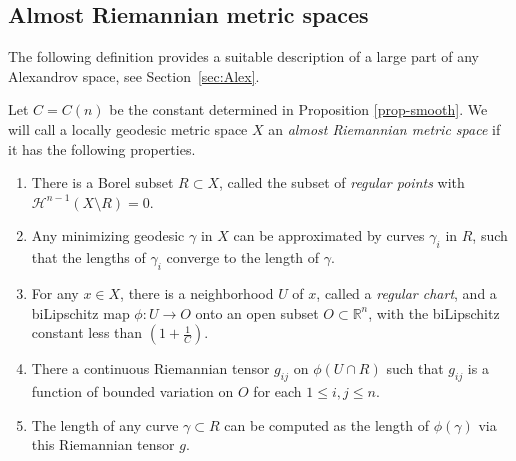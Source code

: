 \documentclass[12pt,leqno,intlimits]{amsart}
\numberwithin{equation}{section}
\theoremstyle{definition}
\theoremstyle{remark}
\newcommand{\R}{\mathbb{R}}
\def\co{\colon\thinspace}
\def\:{\colon}
\begin{document}


\subsection{Almost Riemannian metric spaces}
The following definition provides a suitable description of a  large part of any Alexandrov space, see Section~\ref{sec:Alex}.

 Let  $C =C(n)$ be the constant determined in  Proposition \ref{prop-smooth}. We will call  a locally geodesic metric space
 $X$ an \emph{almost Riemannian metric space}  if it has the following properties.
 \begin{enumerate}
 \item  There is   a Borel subset $R\subset X$, called the subset of \emph{regular points} with $\mathcal H^{n-1} (X\setminus R)=0$.
 \item Any   minimizing geodesic $\gamma$ in $X$ can be approximated by curves $\gamma _i$ in $R$, such that the lengths of $\gamma _i$ converge to the length of  $\gamma$.
\item For any  $x\in X$, there is a neighborhood $U$ of $x$, called a \emph{regular chart}, and  a biLipschitz map
$\phi\:U\to O$ onto an open subset $O\subset \R^n$, with the biLipschitz constant less than $(1+\frac 1 C)$.
 \item There a continuous Riemannian tensor $g_{ij} $ on $\phi (U\cap R)$ such that $g_{ij}$ is a  function of bounded variation on $O$
for each $1\leq i,j \leq n$.
 \item The length of any curve $\gamma \subset R$ can be computed as the length of $\phi (\gamma )$ via this Riemannian tensor $g$.
\end{enumerate}
\end{document}
